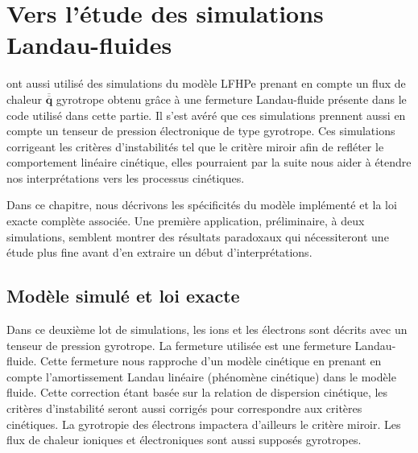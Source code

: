 \chapter{Vers l'étude des simulations Landau-fluides}
\renewcommand\partie{\Partie\ Chapitre \thechapter}
\label{ch-34}

\bigskip
\minitoc  

\cite{ferrand_fluid_2021} ont aussi utilisé des simulations du modèle \acs{LFHPe} prenant en compte un flux de chaleur $\overline{\overline{\boldsymbol{q}}}$ gyrotrope obtenu grâce à une fermeture Landau-fluide présente dans le code utilisé dans cette partie. Il s'est avéré que ces simulations prennent aussi en compte un tenseur de pression électronique de type gyrotrope.
Ces simulations corrigeant les critères d'instabilités tel que le critère miroir afin de refléter le comportement linéaire cinétique, elles pourraient par la suite nous aider à étendre nos interprétations vers les processus cinétiques. 

Dans ce chapitre, nous décrivons les spécificités du modèle implémenté et la loi exacte complète associée. Une première application, préliminaire, à deux simulations, semblent montrer des résultats paradoxaux qui nécessiteront une étude plus fine avant d'en extraire un début d'interprétations. 


\section{Modèle simulé et loi exacte}
\label{sec-341}

Dans ce deuxième lot de simulations, les ions et les électrons sont décrits avec un tenseur de pression gyrotrope. La fermeture utilisée est une fermeture Landau-fluide. Cette fermeture nous rapproche d'un modèle cinétique en prenant en compte l'amortissement Landau linéaire (phénomène cinétique) dans le modèle fluide. Cette correction étant basée sur la relation de dispersion cinétique, les critères d'instabilité seront aussi corrigés pour correspondre aux critères cinétiques. La gyrotropie des électrons impactera d'ailleurs le critère miroir. Les flux de chaleur ioniques et électroniques sont aussi supposés gyrotropes.

